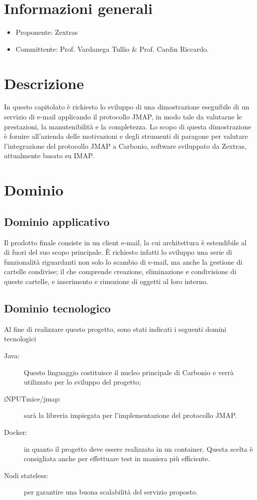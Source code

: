 \documentclass[12pt]{report}
\begin{document}
\section{Informazioni generali}
\begin{itemize}
    \item Proponente: Zextras
    \item Committente: Prof. Vardanega Tullio \& Prof. Cardin Riccardo.
\end{itemize}

\section{Descrizione}
In questo capitolato è richiesto lo sviluppo di una dimostrazione eseguibile di un servizio di e-mail applicando il protocollo JMAP, in modo tale da valutarne le prestazioni, la manutenibilità e la completezza. Lo scopo di questa dimostrazione è fornire all'azienda delle motivazioni e degli strumenti di paragone per valutare l'integrazione del protocollo JMAP a Carbonio, software sviluppato da Zextras, attualmente basato su IMAP.

\section{Dominio}
\subsection{Dominio applicativo}
Il prodotto finale consiste in un client e-mail, la cui architettura è estendibile al di fuori del suo scopo principale. È richiesto infatti lo sviluppo una serie di funzionalità riguardanti non solo lo scambio di e-mail, ma anche la gestione di cartelle condivise; il che comprende creazione, eliminazione e condivisione di queste cartelle, e inserimento e rimozione di oggetti al loro interno. 

\subsection{Dominio tecnologico}
Al fine di realizzare questo progetto, sono stati indicati i seguenti domini tecnologici
\begin{description}
    \item[Java:] Questo linguaggio costituisce il nucleo principale di Carbonio e verrà utilizzato per lo sviluppo del progetto;
    \item[iNPUTmice/jmap:] sarà la libreria impiegata per l’implementazione del protocollo JMAP.
    \item[Docker:] in quanto il progetto deve essere realizzato in un container. Questa scelta è consigliata anche per effettuare test in maniera più efficiente.
    \item[Nodi stateless:] per garantire una buona scalabilità del servizio proposto.
\end{description}
\end{document}
